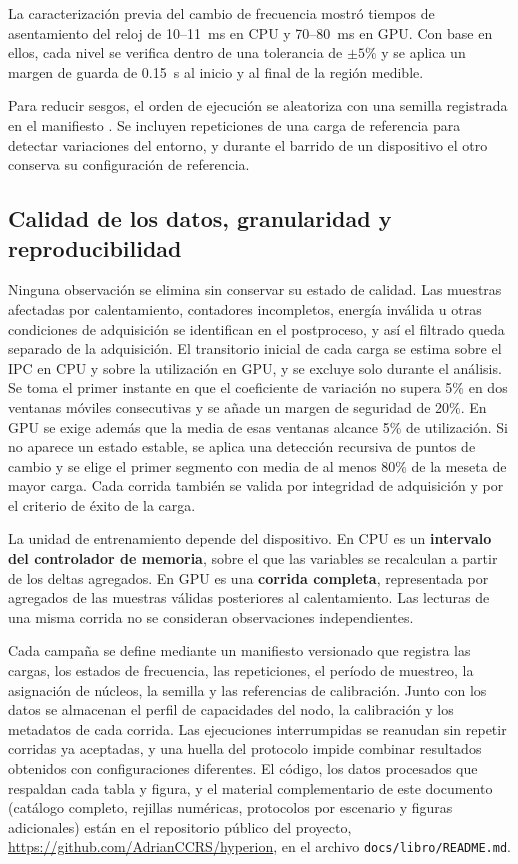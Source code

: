 La caracterización previa del cambio de frecuencia mostró tiempos de asentamiento del reloj de 10--11~ms en CPU y 70--80~ms en GPU. Con base en ellos, cada nivel se verifica dentro de una tolerancia de $\pm5\%$ y se aplica un margen de guarda de 0.15~s al inicio y al final de la región medible.

Para reducir sesgos, el orden de ejecución se aleatoriza con una semilla registrada en el manifiesto \cite{Montgomery2017}. Se incluyen repeticiones de una carga de referencia para detectar variaciones del entorno, y durante el barrido de un dispositivo el otro conserva su configuración de referencia.


\subsection{Calidad de los datos, granularidad y reproducibilidad}

Ninguna observación se elimina sin conservar su estado de calidad. Las muestras afectadas por calentamiento, contadores incompletos, energía inválida u otras condiciones de adquisición se identifican en el postproceso, y así el filtrado queda separado de la adquisición. El transitorio inicial de cada carga se estima sobre el IPC en CPU y sobre la utilización en GPU, y se excluye solo durante el análisis. Se toma el primer instante en que el coeficiente de variación no supera 5\% en dos ventanas móviles consecutivas y se añade un margen de seguridad de 20\%. En GPU se exige además que la media de esas ventanas alcance 5\% de utilización. Si no aparece un estado estable, se aplica una detección recursiva de puntos de cambio y se elige el primer segmento con media de al menos 80\% de la meseta de mayor carga. Cada corrida también se valida por integridad de adquisición y por el criterio de éxito de la carga.

La unidad de entrenamiento depende del dispositivo. En CPU es un \textbf{intervalo del controlador de memoria}, sobre el que las variables se recalculan a partir de los deltas agregados. En GPU es una \textbf{corrida completa}, representada por agregados de las muestras válidas posteriores al calentamiento. Las lecturas de una misma corrida no se consideran observaciones independientes.

\label{sec:met-reproducibilidad}Cada campaña se define mediante un manifiesto versionado que registra las cargas, los estados de frecuencia, las repeticiones, el período de muestreo, la asignación de núcleos, la semilla y las referencias de calibración. Junto con los datos se almacenan el perfil de capacidades del nodo, la calibración y los metadatos de cada corrida. Las ejecuciones interrumpidas se reanudan sin repetir corridas ya aceptadas, y una huella del protocolo impide combinar resultados obtenidos con configuraciones diferentes. El código, los datos procesados que respaldan cada tabla y figura, y el material complementario de este documento (catálogo completo, rejillas numéricas, protocolos por escenario y figuras adicionales) están en el repositorio público del proyecto, \url{https://github.com/AdrianCCRS/hyperion}, en el archivo \texttt{docs/libro/README.md}.

